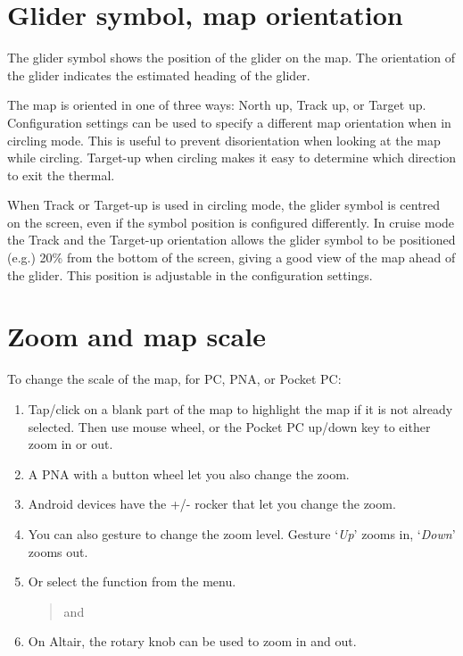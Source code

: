 \section{Glider symbol, map orientation}
The glider symbol shows the position of the glider on the map.  The
orientation of the glider indicates the estimated heading of the
glider.

The map is oriented in one of three ways: North up,
Track up, or Target up.  Configuration settings  can be used
to specify a different map orientation when in circling mode. This is useful to prevent
disorientation when looking at the map while circling.  Target-up when
circling makes it easy to determine which direction to exit the
thermal.

When Track or Target-up is used in circling mode, the glider symbol is
centred on the screen, even if the symbol position is configured differently.
In cruise mode the Track and the Target-up orientation allows the glider
symbol to be positioned (e.g.) 20\% from the bottom of the screen, giving a good view of the
map ahead of the glider.  This position is adjustable in the configuration
 settings.

\section{Zoom and map scale}\label{sec:zooming}

To change the scale of the map, for PC, PNA, or Pocket PC:
\begin{enumerate}
\item Tap/click on a blank part of the map to highlight the map if it is not
already selected.
Then use mouse wheel, or the Pocket PC up/down key to either zoom
in or out.
\item A PNA with a button wheel let you also change the zoom. 
\item Android devices have the +/- rocker that let you change the zoom. 
\item You can also gesture to change the zoom level. Gesture 
`{\it Up}' zooms in, `{\it Down}' zooms out.
\item Or select the function from the menu.
\begin{quote}
\blink{} and 
\end{quote}
\item On Altair, the rotary knob can be used to zoom in and out.
\end{enumerate}

